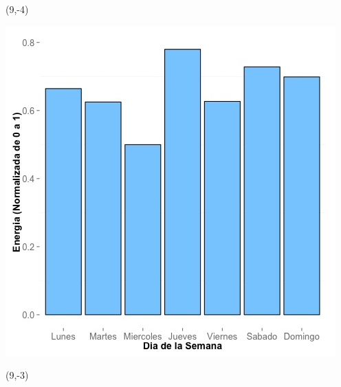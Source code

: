 \documentclass{article}\usepackage[]{graphicx}\usepackage[]{color}
\newenvironment{knitrout}{}{} %
\begin{document}
 \begin{textblock}{1}(9,-4)
\begin{minipage}{20em}
\begingroup

\endgroup
\end{minipage}
\end{textblock}


\begin{knitrout}
\color{fgcolor}
\includegraphics[scale=0.65]{figure/A13_day_of_week_plot} 
\end{knitrout}


 \begin{textblock}{1}(9,-3)
\begin{minipage}{20em}
\begingroup

\endgroup
\end{minipage}
\end{textblock}
\end{document}
